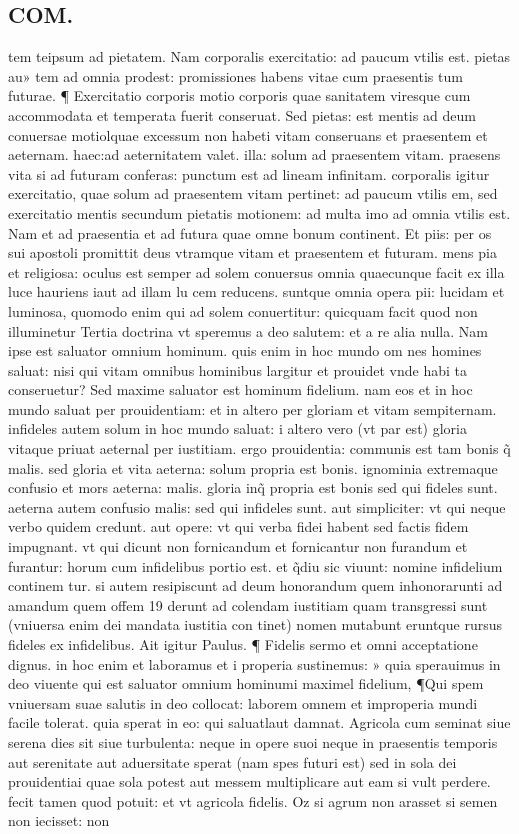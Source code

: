 \documentclass{article}
\begin{document}
\begin{pages}
\section*{COM. }
\marginpar{[ p.4 ]}\pstart tem teipsum ad pietatem. Nam corporalis exercitatio: ad paucum vtilis est. pietas au» tem ad omnia prodest: promissiones habens vitae cum praesentis tum futurae. ¶ Exercitatio corporis motio corporis quae sanitatem viresque cum accommodata et temperata fuerit conseruat. Sed pietas: est mentis ad deum conuersae motiolquae excessum non habeti vitam conseruans et praesentem et aeternam. haec:ad aeternitatem valet. illa: solum ad praesentem vitam. praesens vita si ad futuram conferas: punctum est ad lineam infinitam. corporalis igitur exercitatio, quae solum ad praesentem vitam pertinet: ad paucum vtilis em, sed exercitatio mentis secundum pietatis motionem: ad multa imo ad omnia vtilis est. Nam et ad praesentia et ad futura quae omne bonum continent. Et piis: per os sui apostoli promittit deus vtramque vitam et praesentem et futuram. mens pia et religiosa: oculus est semper ad solem conuersus omnia quaecunque facit ex illa luce hauriens iaut ad illam lu cem reducens. suntque omnia opera pii: lucidam et luminosa, quomodo enim qui ad solem conuertitur: quicquam facit quod non illuminetur Tertia doctrina vt speremus a deo salutem: et a re alia nulla. Nam ipse est saluator omnium hominum. quis enim in hoc mundo om nes homines saluat: nisi qui vitam omnibus hominibus largitur et prouidet vnde habi ta conseruetur? Sed maxime saluator est hominum fidelium. nam eos et in hoc mundo saluat per prouidentiam: et in altero per gloriam et vitam sempiternam. infideles autem solum in hoc mundo saluat: i altero vero (vt par est) gloria vitaque priuat aeternal per iustitiam. ergo prouidentia: communis est tam bonis q̃ malis. sed gloria et vita aeterna: solum propria est bonis. ignominia extremaque confusio et mors aeterna: malis. gloria inq̃ propria est bonis sed qui fideles sunt. aeterna autem confusio malis: sed qui infideles sunt. aut simpliciter: vt qui neque verbo quidem credunt. aut opere: vt qui verba fidei habent sed factis fidem impugnant. vt qui dicunt non fornicandum et fornicantur non furandum et furantur: horum cum infidelibus portio est. et q̃diu sic viuunt: nomine infidelium continem tur. si autem resipiscunt ad deum honorandum quem inhonorarunti ad amandum quem offem 19 derunt ad colendam iustitiam quam transgressi sunt (vniuersa enim dei mandata iustitia con tinet) nomen mutabunt eruntque rursus fideles ex infidelibus. Ait igitur Paulus. ¶ Fidelis sermo et omni acceptatione dignus. in hoc enim et laboramus et i properia sustinemus: » quia sperauimus in deo viuente qui est saluator omnium hominumi maximel fidelium, ¶Qui spem vniuersam suae salutis in deo collocat: laborem omnem et improperia mundi facile tolerat. quia sperat in eo: qui saluatlaut damnat. Agricola cum seminat siue serena dies sit siue turbulenta: neque in opere suoi neque in praesentis temporis aut serenitate aut aduersitate sperat (nam spes futuri est) sed in sola dei prouidentiai quae sola potest aut messem multiplicare aut eam si vult perdere. fecit tamen quod potuit: et vt agricola fidelis. Oz si agrum non arasset si semen non iecisset: non 
\end{pages}
\end{document}
